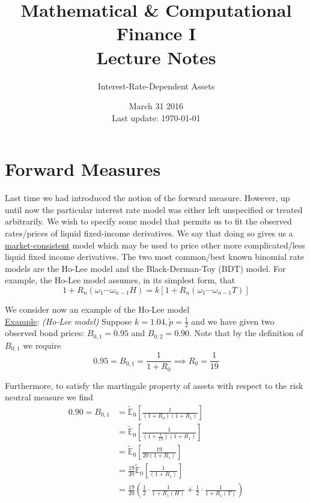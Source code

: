 \documentclass[12pt]{article}
\newlength\tindent
\renewcommand{\indent}{\hspace*{\tindent}}
\newcommand{\E}{\mathbb E}
\begin{document}
 
 
\title{Mathematical \& Computational Finance I\\Lecture Notes}
\author{Interest-Rate-Dependent Assets}
\date{March 31 2016 \\ Last update: \today{}}
\maketitle

\section{Forward Measures} 

\indent Last time we had introduced the notion of the forward measure. However, up until now the particular interest rate model was either left unspecified or treated arbitrarily. We wish to specify some model that permits us to fit the observed rates/prices of liquid fixed-income derivatives. We say that doing so gives us a \underline{market-consistent} model which may be used to price other more complicated/less liquid fixed income derivatives. The two most common/best known binomial rate models are the Ho-Lee model and the Black-Derman-Toy (BDT) model. For example, the Ho-Lee model assumes, in its simplest form, that
\begin{equation*}
	1 + R_n(\omega_1\cdots\omega_{n - 1}H) = k[1 + R_n(\omega_1\cdots\omega_{n - 1}T)]
\end{equation*}

We consider now an example of the Ho-Lee model \\

\underline{Example}: {\em (Ho-Lee model)} Suppose $k = 1.04, \tilde{p} = \frac{1}{2}$ and we have given two observed bond prices: $B_{0,1} = 0.95$ and $B_{0,2} = 0.90$. Note that by the definition of $B_{0,1}$ we require
\begin{equation*}
	0.95 = B_{0,1} = \frac{1}{1 + R_0} \implies R_0 = \frac{1}{19}
\end{equation*}

\indent Furthermore, to satisfy the martingale property of assets with respect to the risk neutral measure we find
\begin{align*}
	0.90 = B_{0,1} &= \tilde{\E}_0 \left[ \frac{1}{(1 + R_0)(1 + R_1)} \right] \\
	&= \tilde{\E}_0 \left[ \frac{1}{(1 + \frac{1}{19})(1 + R_1)} \right] \\
	&= \tilde{\E}_0 \left[ \frac{19}{20(1 + R_1)} \right] \\
	&= \frac{19}{20} \tilde{\E}_0 \left[ \frac{1}{(1 + R_1)} \right] \\
	&= \frac{19}{20} \left( \frac{1}{2}\cdot\frac{1}{1 + R_1(H)} + \frac{1}{2} \cdot \frac{1}{1 + R_1(T)} \right) 
\end{align*}
\end{document}
